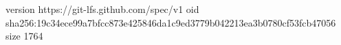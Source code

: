 version https://git-lfs.github.com/spec/v1
oid sha256:19c34ece99a7bfcc873e425846da1c9ed3779b042213ea3b0780cf53fcb47056
size 1764
